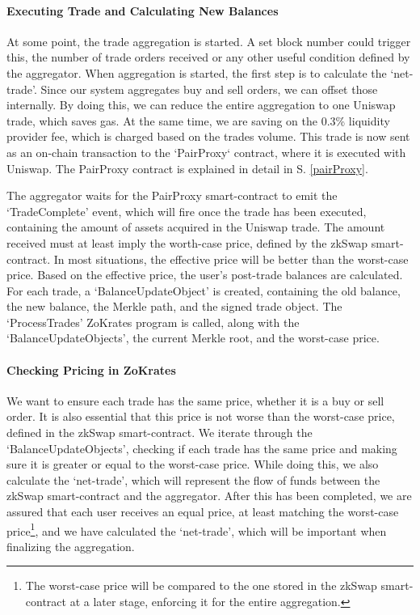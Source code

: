 \documentclass[../../thesis.tex]{subfiles}
\begin{document}
\paragraph{Executing Trade and Calculating New Balances}
At some point, the trade aggregation is started. A set block number could trigger this, the number of trade orders received or any other useful condition defined by the aggregator. When aggregation is started, the first step is to calculate the `net-trade'. Since our system aggregates buy and sell orders, we can offset those internally. By doing this, we can reduce the entire aggregation to one Uniswap trade, which saves gas. At the same time, we are saving on the 0.3\% liquidity provider fee, which is charged based on the trades volume. This trade is now sent as an on-chain transaction to the `PairProxy` contract, where it is executed with Uniswap. The PairProxy contract is explained in detail in S. \ref{pairProxy}. 

The aggregator waits for the PairProxy smart-contract to emit the `TradeComplete' event, which will fire once the trade has been executed, containing the amount of assets acquired in the Uniswap trade. The amount received must at least imply the worth-case price, defined by the zkSwap smart-contract. In most situations, the effective price will be better than the worst-case price. Based on the effective price, the user's post-trade balances are calculated. For each trade, a `BalanceUpdateObject' is created, containing the old balance, the new balance, the Merkle path, and the signed trade object. The `ProcessTrades' ZoKrates program is called, along with the `BalanceUpdateObjects', the current Merkle root, and the worst-case price.

\paragraph{Checking Pricing in ZoKrates}
We want to ensure each trade has the same price, whether it is a buy or sell order. It is also essential that this price is not worse than the worst-case price, defined in the zkSwap smart-contract. We iterate through the `BalanceUpdateObjects', checking if each trade has the same price and making sure it is greater or equal to the worst-case price. While doing this, we also calculate the `net-trade', which will represent the flow of funds between the zkSwap smart-contract and the aggregator. After this has been completed, we are assured that each user receives an equal price, at least matching the worst-case price\footnote{The worst-case price will be compared to the one stored in the zkSwap smart-contract at a later stage, enforcing it for the entire aggregation.}, and we have calculated the `net-trade', which will be important when finalizing the aggregation.
\end{document}
